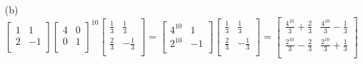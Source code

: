 \documentclass[letterpaper,fleqn,leqno]{article}
\begin{document}
{{\begin{enumerate}
				\item [(b)]
				$\begin{bmatrix*}
					1 & 1 \\
					2 & -1 \\
				\end{bmatrix*}
				\begin{bmatrix*}
					4 & 0 \\
					0 & 1 \\
				\end{bmatrix*}^{10}
				\begin{bmatrix*}
					\frac{1}{3} & \frac{1}{3} \\
					\frac{2}{3} & -\frac{1}{3} \\
				\end{bmatrix*}=
				\begin{bmatrix*}
					4^{10} & 1 \\
					2^{10} & -1 \\
				\end{bmatrix*}
				\begin{bmatrix*}
					\frac{1}{3} & \frac{1}{3} \\
					\frac{2}{3} & -\frac{1}{3} \\
				\end{bmatrix*}=
				\begin{bmatrix*}
					\frac{4^{10}}{3}+\frac{2}{3} & \frac{4^{10}}{3}-\frac{1}{3} \\
					\frac{2^{10}}{3}-\frac{2}{3} & \frac{2^{10}}{3}+\frac{1}{3} \\
				\end{bmatrix*}$ \\
			\end{enumerate}
		}
	}
\end{document}
